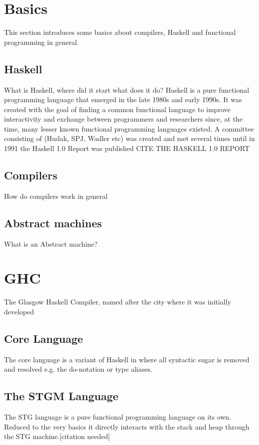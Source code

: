 \documentclass[runningheads]{llncs}
\begin{document}
\section{Basics}

This section introduces some basics about compilers, Haskell and functional programming in general.

\subsection{Haskell}

What is Haskell, where did it start what does it do?
\cite{hudak2007history}
Haskell is a pure functional programming language that emerged in the late 1980s and early 1990s. It was created with the goal of finding a common functional language to improve interactivity and exchange between programmers and researchers since, at the time, many lesser known functional programming languages existed. A committee consisting of (Hudak, SPJ, Wadler etc) was created and met several times until in 1991 the Haskell 1.0 Report was published CITE THE HASKELL 1.0 REPORT

\subsection{Compilers}
How do compilers work in general


\subsection{Abstract machines}
What is an Abstract machine?

\section{GHC}
The Glasgow Haskell Compiler, named after the city where it was initially developed


\subsection{Core Language}
The core language is a variant of Haskell in where all syntactic sugar is removed and resolved e.g. the do-notation or type aliases.


\subsection{The STGM Language}
The STG language is a pure functional programming language on its own. Reduced to the very basics it directly interacts with the stack and heap through the STG machine.[citation needed]
\end{document}

